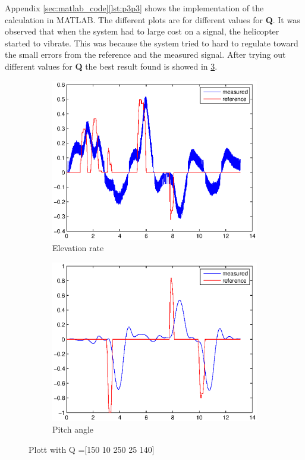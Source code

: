 Appendix \ref{sec:matlab_code}\ref{lst:p3p3} shows the implementation of the calculation in MATLAB. The different plots are for different values for \textbf{Q}. It was observed that when the system had to large cost on a signal, the helicopter started to vibrate. This was because the system tried to hard to regulate toward the small errors from the reference and the measured signal. After trying out different values for \textbf{Q} the best result found is showed in \cref{p3p351}.

\begin{figure}[H]
\graphicspath{ {Part3_pictures/}}
\begin{subfigure}{0.5\textwidth}
    \includegraphics[width=0.9\linewidth]{Part3_pictures/p3p3/Q5elevation.eps} 
    \caption{Elevation rate}
    \label{p3p3Q5e}
\end{subfigure}
\begin{subfigure}{0.5\textwidth}
    \includegraphics[width=0.9\linewidth]{Part3_pictures/p3p3/Q5pitch.eps}
    \caption{Pitch angle}
    \label{p3p2Q5p}
\end{subfigure}
\caption{Plott with Q =[150 10 250 25 140]}
\label{p3p351}
\end{figure}

